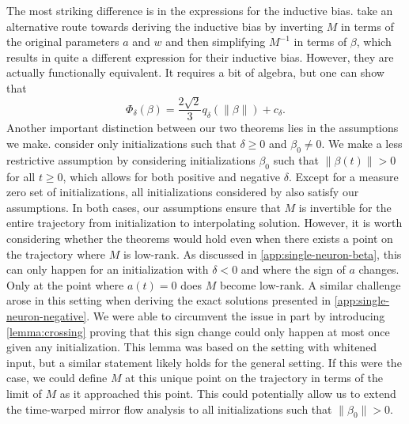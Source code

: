 \documentclass{article}
\theoremstyle{plain}
\theoremstyle{definition}
\theoremstyle{remark}
\begin{document}
The most striking difference is in the expressions for the inductive bias.
%
\citet{azulay2021implicit} take an alternative route towards deriving the inductive bias by inverting $M$ in terms of the original parameters $a$ and $w$ and then simplifying $M^{-1}$ in terms of $\beta$, which results in quite a different expression for their inductive bias.
%
However, they are actually functionally equivalent.
%
It requires a bit of algebra, but one can show that
\begin{equation}
    \Phi_\delta(\beta) =  \frac{2\sqrt{2}}{3}q_\delta(\|\beta\|) + c_\delta.
\end{equation}
%
%
Another important distinction between our two theorems lies in the assumptions we make.
%
\citet{azulay2021implicit} consider only initializations such that $\delta \ge 0$ and $\beta_0 \neq 0$. 
%
We make a less restrictive assumption by considering initializations $\beta_0$ such that $\|\beta(t)\| > 0$ for all $t \ge 0$, which allows for both positive and negative $\delta$.
%
Except for a measure zero set of initializations, all initializations considered by \citet{azulay2021implicit} also satisfy our assumptions.
%
In both cases, our assumptions ensure that $M$ is invertible for the entire trajectory from initialization to interpolating solution. 
%
However, it is worth considering whether the theorems would hold even when there exists a point on the trajectory where $M$ is low-rank. 
%
As discussed in \cref{app:single-neuron-beta}, this can only happen for an initialization with $\delta < 0$ and where the sign of $a$ changes.
%
Only at the point where $a(t) = 0$ does $M$ become low-rank.
%
A similar challenge arose in this setting when deriving the exact solutions presented in \cref{app:single-neuron-negative}. 
%
We were able to circumvent the issue in part by introducing \cref{lemma:crossing} proving that this sign change could only happen at most once given any initialization.
%
This lemma was based on the setting with whitened input, but a similar statement likely holds for the general setting.
%
If this were the case, we could define $M$ at this unique point on the trajectory in terms of the limit of $M$ as it approached this point. 
%
This could potentially allow us to extend the time-warped mirror flow analysis to all initializations such that $\|\beta_0\| > 0$.
\end{document}
